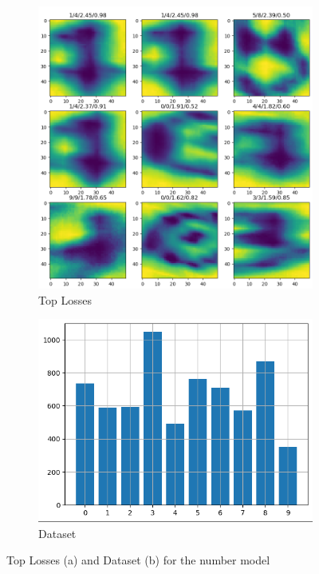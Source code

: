 \documentclass[titlepage, twocolumn]{article}
\begin{document}
\begin{figure}
    \begin{center}
        \begin{subfigure}{0.5\linewidth}
            \centering
            \includegraphics[width=\linewidth]{NumTopLoss.png}
            \caption{Top Losses}
            \label{fig:numsloss}
          \end{subfigure}%
          \begin{subfigure}{0.5\linewidth}
            \centering
            \includegraphics[width=\linewidth]{Numbers.png}
            \caption{Dataset}
            \label{fig:numbers}
          \end{subfigure}
    \end{center}
    \caption{Top Losses (a) and Dataset (b) for the number model}
    \label{fig:numbers-both}
\end{figure}
\end{document}
